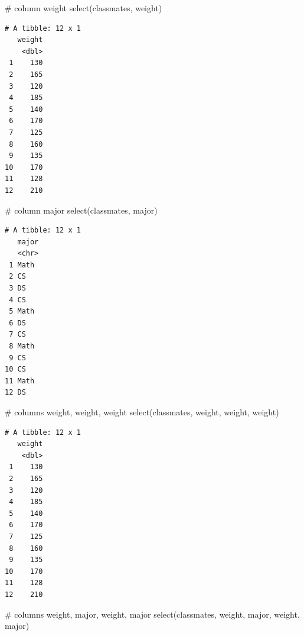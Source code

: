 \documentclass[
  letterpaper,
  DIV=11,
  numbers=noendperiod]{scrreprt}
\newenvironment{Shaded}{\begin{snugshade}}{\end{snugshade}}
\newcommand{\CommentTok}[1]{\textcolor[rgb]{0.37,0.37,0.37}{#1}}
\newcommand{\FunctionTok}[1]{\textcolor[rgb]{0.28,0.35,0.67}{#1}}
\newcommand{\NormalTok}[1]{\textcolor[rgb]{0.00,0.23,0.31}{#1}}
\begin{document}
\begin{tcolorbox}[enhanced jigsaw, colbacktitle=quarto-callout-tip-color!10!white, opacitybacktitle=0.6, breakable, left=2mm, leftrule=.75mm, toprule=.15mm, toptitle=1mm, bottomtitle=1mm, colframe=quarto-callout-tip-color-frame, opacityback=0, coltitle=black, arc=.35mm, titlerule=0mm, colback=white, bottomrule=.15mm, title=\textcolor{quarto-callout-tip-color}{\faLightbulb}\hspace{0.5em}{Answer}, rightrule=.15mm]

\begin{Shaded}
\begin{Highlighting}[]
\CommentTok{\# column weight}
\FunctionTok{select}\NormalTok{(classmates, weight)}
\end{Highlighting}
\end{Shaded}

\begin{verbatim}
# A tibble: 12 x 1
   weight
    <dbl>
 1    130
 2    165
 3    120
 4    185
 5    140
 6    170
 7    125
 8    160
 9    135
10    170
11    128
12    210
\end{verbatim}

\begin{Shaded}
\begin{Highlighting}[]
\CommentTok{\# column major}
\FunctionTok{select}\NormalTok{(classmates, major)}
\end{Highlighting}
\end{Shaded}

\begin{verbatim}
# A tibble: 12 x 1
   major
   <chr>
 1 Math 
 2 CS   
 3 DS   
 4 CS   
 5 Math 
 6 DS   
 7 CS   
 8 Math 
 9 CS   
10 CS   
11 Math 
12 DS   
\end{verbatim}

\begin{Shaded}
\begin{Highlighting}[]
\CommentTok{\# columns weight, weight, weight }
\FunctionTok{select}\NormalTok{(classmates, weight, weight, weight)}
\end{Highlighting}
\end{Shaded}

\begin{verbatim}
# A tibble: 12 x 1
   weight
    <dbl>
 1    130
 2    165
 3    120
 4    185
 5    140
 6    170
 7    125
 8    160
 9    135
10    170
11    128
12    210
\end{verbatim}

\begin{Shaded}
\begin{Highlighting}[]
\CommentTok{\# columns weight, major, weight, major}
\FunctionTok{select}\NormalTok{(classmates, weight, major, weight, major)}
\end{Highlighting}
\end{Shaded}


\end{tcolorbox}
\end{document}
